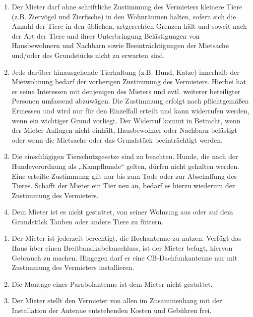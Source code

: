 \documentclass{scrreprt}[12pt,a4paper,twoside,duplex]
\begin{document}
\begin{contract}
	\begin{enumerate}
		\item Der Mieter darf ohne schriftliche Zustimmung des Vermieters kleinere Tiere (z.B. Ziervögel und Zierfische) in den Wohnräumen halten, sofern sich die Anzahl der Tiere in den üblichen, artgerechten Grenzen hält und soweit nach der Art der Tiere und ihrer Unterbringung Belästigungen von Hausbewohnern und Nachbarn sowie Beeinträchtigungen der Mietsache und/oder des Grundstücks nicht zu erwarten sind.
		\item Jede darüber hinausgehende Tierhaltung (z.B. Hund, Katze) innerhalb der Mietwohnung bedarf der vorherigen Zustimmung des Vermieters. Hierbei hat er seine Interessen mit denjenigen des Mieters und evtl. weiterer beteiligter Personen umfassend abzuwägen. Die Zustimmung erfolgt nach pflichtgemäßen Ermessen und wird nur für den Einzelfall erteilt und kann widerrufen werden, wenn ein wichtiger Grund vorliegt. Der Widerruf kommt in Betracht, wenn der Mieter Auflagen nicht einhält, Hausbewohner oder Nachbarn belästigt oder wenn die Mietsache oder das Grundstück beeinträchtigt werden.
		\item Die einschlägigen Tierschutzgesetze sind zu beachten. Hunde, die nach der Hundeverordnung als „Kampfhunde“ gelten, dürfen nicht gehalten werden. Eine erteilte Zustimmung gilt nur bis zum Tode oder zur Abschaffung des Tieres. Schafft der Mieter ein Tier neu an, bedarf es hierzu wiederum der Zustimmung des Vermieters.
		\item Dem Mieter ist es nicht gestattet, von seiner Wohnung aus oder auf dem Grundstück Tauben oder andere Tiere zu füttern.
	\end{enumerate}
\end{contract}

\begin{contract}
	\begin{enumerate}
		\item Der Mieter ist jederzeit berechtigt, die Hochantenne zu nutzen. Verfügt das Haus über einen Breitbandkabelanschluss, ist der Mieter befugt, hiervon Gebrauch zu machen. Hingegen darf er eine CB-Dachfunkantenne nur mit Zustimmung des Vermieters installieren.
		\item Die Montage einer Parabolantenne ist dem Mieter nicht gestattet.
		\item Der Mieter stellt den Vermieter von allen im Zusammenhang mit der Installation der Antenne entstehenden Kosten und Gebühren frei.
	\end{enumerate}
\end{contract}
\end{document}
